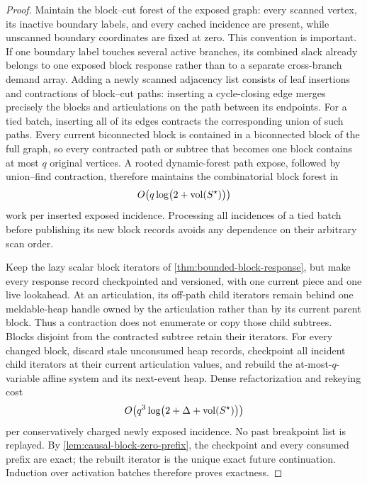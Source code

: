 \begin{proof}
Maintain the block--cut forest of the exposed graph: every scanned vertex,
its inactive boundary labels, and every cached incidence are present, while
unscanned boundary coordinates are fixed at zero.  This convention is
important.  If one boundary label touches several active branches, its
combined slack already belongs to one exposed block response rather than to a
separate cross-branch demand array.  Adding a newly scanned adjacency list
consists of leaf insertions and contractions of block--cut paths: inserting a
cycle-closing edge merges precisely the blocks and articulations on the path
between its endpoints.  For a tied batch, inserting all of its edges
contracts the corresponding union of such paths.  Every current biconnected
block is contained in a biconnected block of the full graph, so every
contracted path or subtree that becomes one block contains at most $q$
original vertices.  A rooted dynamic-forest path expose, followed by
union--find contraction, therefore maintains the combinatorial block forest
in
\begin{equation}
 O\!\left(q\log\bigl(2+\operatorname{vol}(S^\star)\bigr)\right)
 \label{eq:causal-block-forest-update}
\end{equation}
work per inserted exposed incidence.  Processing all incidences of a tied
batch before publishing its new block records avoids any dependence on their
arbitrary scan order.

Keep the lazy scalar block iterators of
\cref{thm:bounded-block-response}, but make every response record checkpointed
and versioned, with one current piece and one live lookahead.  At an
articulation, its off-path child iterators remain
behind one meldable-heap handle owned by the articulation rather than by its
current parent block.  Thus a contraction does not enumerate or copy those
child subtrees.  Blocks disjoint from the contracted subtree retain their
iterators.  For every changed block, discard stale unconsumed heap records,
checkpoint all incident child iterators at their current articulation values,
and rebuild the at-most-$q$-variable affine system and its next-event heap.
Dense refactorization and rekeying cost
\begin{equation}
 O\!\left(q^3\log\bigl(2+\Delta+\operatorname{vol}(S^\star)\bigr)\right)
 \label{eq:causal-block-rebuild}
\end{equation}
per conservatively charged newly exposed incidence.  No past breakpoint list is
replayed.  By \cref{lem:causal-block-zero-prefix}, the checkpoint and every
consumed prefix are exact; the rebuilt iterator is the unique exact future
continuation.  Induction over activation batches therefore proves exactness.


\end{proof}
